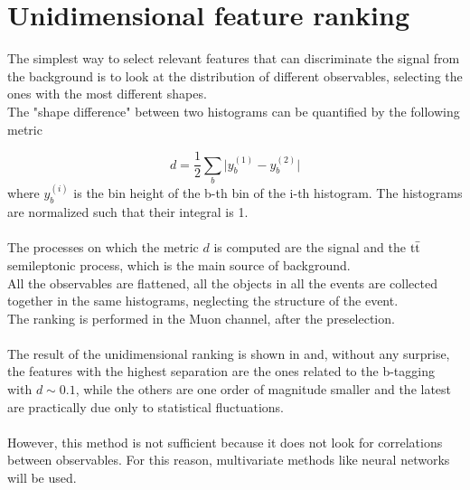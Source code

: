 \begin{minipage}[H]{\linewidth}
\begin{minipage}{0.62\linewidth}
\section{Unidimensional feature ranking}
The simplest way to select relevant features that can discriminate the signal from the background is to look at the distribution of different observables, selecting the ones with the most different shapes.\\
The "shape difference" between two histograms can be quantified by the following metric

\begin{equation}
    d=\frac{1}{2}\sum_b \bigg| y_b^{(1)}-y_b^{(2)} \bigg|
\end{equation}
where $y_b^{(i)}$ is the bin height of the b-th bin of the i-th histogram. The histograms are normalized such that their integral is 1.\\
\\
The processes on which the metric $d$ is computed are the signal and the ${{\text{t}}{\bar{\text{t}}}}$ semileptonic process, which is the main source of background.\\
All the observables are flattened, \ie all the objects in all the events are collected together in the same histograms, neglecting the structure of the event.\\
The ranking is performed in the Muon channel, after the preselection.\\\\
The result of the unidimensional ranking is shown in  and, without any surprise, the features with the highest separation are the ones related to the b-tagging with $d\sim 0.1$, while the others are one order of magnitude smaller and the latest are practically due only to statistical fluctuations.\\
\\
However, this method is not sufficient because it does not look for correlations between observables. For this reason, multivariate methods like neural networks will be used. \\\\\\\\\\    
\end{minipage}
\end{minipage}
